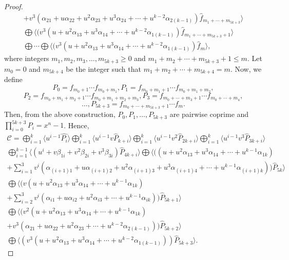 \documentclass{amsart}
\theoremstyle{definition}
\theoremstyle{remark}
\numberwithin{equation}{section}
\begin{document}
\begin{proof}
\begin{gather*}
        + v^3( \alpha_{21} + u\alpha_{22} + u^2\alpha_{23} + u^3\alpha_{24} + \cdots + u^{k-2}\alpha_{2(k-1)} )\hat{f}_{m_1+\cdots+m_{5k+3}} \rangle \\
         \bigoplus \langle (v^3(u + u^2\alpha_{13} + u^3\alpha_{14} + \cdots + u^{k-2}\alpha_{1(k-1)})\hat{f}_{m_1+\cdots+m_{5k+3}+1} \rangle \\
         \bigoplus \cdots \bigoplus \langle (v^3(u + u^2\alpha_{13} + u^3\alpha_{14} + \cdots + u^{k-2}\alpha_{1(k-1)})\hat{f}_{m} \rangle,
		\end{gather*}
  where integers $m_1, m_2, m_3, \dots, m_{5k+3} \geq 0$ and $m_1+m_2+\cdots+m_{5k+3}+1 \leq m $. Let $m_0 = 0$ and $m_{5k+4}$ be the integer such that $m_1+m_2+\cdots+m_{5k+4} = m $. Now, we define \\
   $$P_0=f_{m_0+1}\cdots f_{m_0+m_1}, P_1=f_{m_0+m_1+1}\cdots f_{m_0+m_1+m_2},$$ $$P_2=f_{m_0+m_1+m_2+1}\cdots f_{m_0+m_1+m_2+m_3},P_3=f_{m_0+\cdots+m_3+1}\cdots f_{m_0+\cdots+m_4},$$  $$ \dots, P_{5k+3}=f_{m_0+\cdots+m_{5k+3}+1}\cdots f_{m}.$$
   Then, from the above construction, $P_0,P_1,\dots, P_{5k+3}$ are pairwise coprime and $\prod_{i=0}^{5k+3} P_i=x^n-1$. Hence, \\
   \begin{gather*}
		\mathcal{C}= \bigoplus_{i=1}^{k}\langle u^{i-1}\hat{P_{i}}\rangle \bigoplus_{i=1}^{k}\langle u^{i-1}v\hat{P}_{k+i}\rangle \bigoplus_{i=1}^{k}\langle u^{i-1}v^2\hat{P}_{2k+i}\rangle  \bigoplus_{i=1}^{k}\langle u^{i-1}v^3\hat{P}_{3k+i}\rangle \\
        \bigoplus_{i=1}^{k-1} \langle (u^i+ v\beta_{1i} + v^2\beta_{2i} + v^3\beta_{3i})\hat{P}_{4k+i}\rangle   \bigoplus \langle ((u + u^2\alpha_{13} + u^3\alpha_{14} + \cdots + u^{k-1}\alpha_{1k}) \\
      + \sum_{i=1}^{3} v^i( \alpha_{(i+1)1} + u\alpha_{(i+1)2} + u^2\alpha_{(i+1)3} + u^3\alpha_{(i+1)4} + \cdots + u^{k-1}\alpha_{(i+1)k} ))\hat{P}_{5k}\rangle
     \\  \bigoplus  \langle (v(u + u^2\alpha_{13} + u^3\alpha_{14} + \cdots + u^{k-1}\alpha_{1k})  \\+ \sum_{i=2}^{3} v^i( \alpha_{i1} + u\alpha_{i2} + u^2\alpha_{i3} + \cdots + u^{k-1}\alpha_{ik} ))\hat{P}_{5k+1} \rangle
     \\  \bigoplus  \langle (v^2(u + u^2\alpha_{13} + u^3\alpha_{14} + \cdots + u^{k-1}\alpha_{1k})
    \\ + v^3( \alpha_{21} + u\alpha_{22} + u^2\alpha_{23} + \cdots + u^{k-2}\alpha_{2(k-1)}))\hat{P}_{5k+2}\rangle
     \\  \bigoplus \langle (v^3(u + u^2\alpha_{13} + u^3\alpha_{14} + \cdots + u^{k-2}\alpha_{1(k-1)}))\hat{P}_{5k+3}\rangle. 

\end{gather*}
\end{proof}
\end{document}
